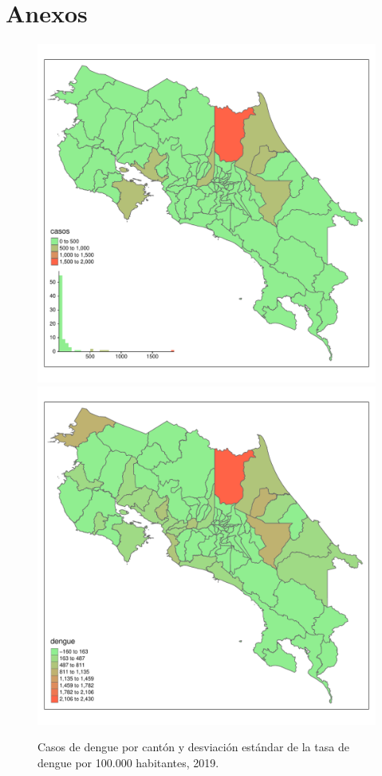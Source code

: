 \documentclass[a4paper,12pt]{report}
\begin{document}
\newpage
\section*{Anexos}

\begin{figure}[hbtp]
\centering
\includegraphics[width=.48\textwidth]{FA1.pdf}
\includegraphics[width=.48\textwidth]{FA2.pdf}
\caption{Casos de dengue por cantón y desviación estándar de la tasa de dengue por 100.000 habitantes, 2019.}
\end{figure}
\newpage
\end{document}
